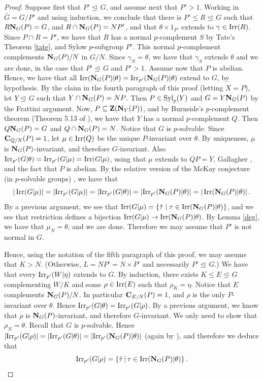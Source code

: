 \documentclass[12pt]{amsart}
\theoremstyle{plain}
\theoremstyle{definition}
\numberwithin{equation}{section}
\newcommand{\Irr}{\operatorname{Irr}}
\def\irrp#1{{\rm Irr}_{p'}(#1)}
\def\irr#1{{\rm Irr}(#1)}
\def\cent#1#2{{\bf C}_{#1}(#2)}
\def\syl#1#2{{\rm Syl}_#1(#2)}
\def\nor{\trianglelefteq\,}
\def\zent#1{{\bf Z}(#1)}
\def\norm#1#2{{\bf N}_{#1}(#2)}
\def\sbs{\subseteq}
\begin{document}
\begin{proof}
Suppose first  that $P' \nor G$, and  assume next that $P'>1$.
Working in $\bar G=G/P'$ and using induction, we conclude that there
is $P' \le R\nor G$ such that $R\norm GP=G$, and $R\cap \norm
GP=NP'$, and that $\theta \times 1_{P'}$ extends to $\gamma \in
\irr{R}$. Since $P\cap R=P'$, we have that $R$ has a normal
$p$-complement $S$ by Tate's Theorem \ref{tate}, and Sylow
$p$-subgroup $P'$. This normal $p$-complement complements $\norm
GP/N$ in $G/N$.   Since $\gamma_N=\theta$, we have that $\gamma_S$ extends
$\theta$ and we are done, in the case that $P'\nor G$ and $P'>1$.
Assume now that $P$ is abelian.
Hence, we have that all $\irr{\norm GP|\theta}=\irrp{\norm GP|\theta}$ extend to $G$, by hypothesis. By the claim in the fourth paragraph
of this proof (letting $X=P$), let $Y \nor G$ such that $Y \cap \norm GP=NP$. Then
$P \in  \syl pY$ and $G=Y \norm GP$ by the Frattini argument. Now,
$P \sbs \zent {\norm YP}$, and by Burnside's $p$-complement theorem
(Theorem 5.13 of \cite{Is08}),
we have that $Y$ has a normal $p$-complement $Q$. Then $Q\norm GP=G$
and $Q\cap \norm GP=N$. Notice that $G$ is $p$-solvable. Since
$\cent{Q/N}P=1$, let $\mu \in \irr Q$ be the unique $P$-invariant
over $\theta$. By uniqueness,  $\mu$ is $\norm GP$-invariant, and
therefore $G$-invariant. Also
$\irrp{G|\theta}=\irrp{G|\mu}=\irr{G|\mu}$, using that $\mu$ extends
to $QP=Y$, Gallagher \cite[Corollary 6.17]{Is}, and the fact that
$P$ is abelian. By the relative version of the McKay conjecture (in
$p$-solvable groups) \cite[Theorem 10.26]{N}, we have that
$$|\Irr(G|\mu)|=|\irrp{G|\mu}|=|\irrp{G|\theta}|=|\irrp{\norm GP|\theta}|=
|\Irr(\norm G
P|\theta)| \, .$$
By a previous argument, we see that
${\rm Irr}(G|\mu)=\{\tilde\tau \mid \tau \in \irr{\norm GP|\theta}\}$, and we see that restriction defines a bijection
$\irr{G|\mu} \rightarrow \irr{\norm GP|\theta}$.  By Lemma
\ref{deg}, we have that $\mu_N=\theta$, and we are done. Therefore
we may assume that $P'$ is not normal in $G$.

Hence, using the notation of the fifth paragraph of this proof, we
may assume that $K>N$. (Otherwise, $L=NP'=N \times P'$ and
necessarily $P' \nor G$.) We have that every ${\rm
Irr}_{p'}(W|\eta)$ extends to $G$. By induction, there exists $K\le
E \nor G$ complementing $W/K$ and some $\rho \in \irr{E}$ such that
$\rho_K=\eta$. Notice that $E$ complements $\norm GP/N$. In
particular $\cent{E/N}P=1$, and $\rho$ is the only $P$-invariant
over $\theta$. Hence ${\rm Irr}_{p'}(G|\theta)={\rm
Irr}_{p'}(G|\rho)$. By a previous argument, we know that $\rho$ is
$\norm GP$-invariant, and therefore $G$-invariant. We only need to
show that $\rho_N=\theta$. Recall that $G$ is $p$-solvable. Hence
$|\irrp{G|\rho}|=|\irrp{G|\theta}|=|\irrp{\norm GP|\theta}|$
(again by \cite[Theorem 10.26]{N}), and
therefore we deduce that
$$\irrp{G|\rho}=\{\tilde\tau \, |\, \tau \in \irr{\norm GP|\theta} \}\, .$$



\end{proof}
\end{document}

